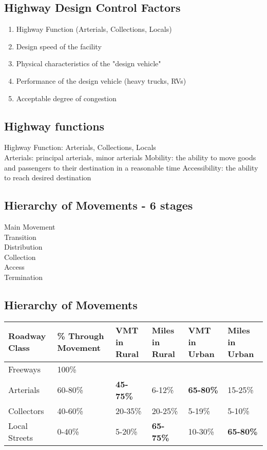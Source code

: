 \documentclass{article}
\begin{document}
  \subsection{Highway Design Control Factors}
  \begin{enumerate}
    \item Highway Function (Arterials, Collections, Locals)
    \item Design speed of the facility
    \item Physical characteristics of the "design vehicle" 
    \item Performance of the design vehicle (heavy trucks, RVs)
    \item Acceptable degree of congestion
  \end{enumerate}

  \subsection{Highway functions}
    Highway Function: Arterials, Collections, Locals \\
    Arterials: principal arterials, minor arterials
    Mobility: the ability to move goods and passengers to their destination in a reasonable time 
    Accessibility: the ability to reach desired destination

  \subsection{Hierarchy of Movements - 6 stages}
  Main Movement \\
  Transition \\
  Distribution \\
  Collection \\
  Access \\
  Termination \\

  \subsection{Hierarchy of Movements}
	\begin{tabular}{|l|p{2cm}|p{2cm}|p{2cm}|p{2cm}|p{2cm}|}
	\hline
	\textbf{Roadway Class} & \textbf{\% Through Movement} & \textbf{VMT in Rural} & \textbf{Miles in Rural} & \textbf{VMT in Urban} & \textbf{Miles in Urban} \\
	\hline
	Freeways      & 100\%     &     &  \\
	Arterials     & 60-80\%   & {\bfseries 45-75\%} & 6-12\%  & {\bfseries 65-80\%}   & 15-25\% \\
	Collectors    & 40-60\%   & 20-35\% & 20-25\% & 5-19\%    & 5-10\% \\
	Local Streets & 0-40\%    & 5-20\%  & {\bfseries 65-75\%} & 10-30\%   & {\bfseries 65-80\%} \\
	\hline
	\end{tabular}
\end{document}
